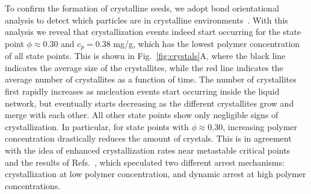 \documentclass[12pt]{article}
\begin{document}
To confirm the formation of crystalline seeds, we adopt bond orientational analysis to detect which particles are in crystalline environments~\cite{russo2013interplay}. 
With this analysis we reveal that crystallization events indeed start occurring for the state point $\phi\approx 0.30$ and $c_p=0.38$ mg/g, which has the lowest
polymer concentration of all state points. This is shown in Fig.~\ref{fig:crystals}A, where the black line indicates the average size of the crystallites, 
while the red line indicates the average number of crystallites as a function of time. The number of crystallites first rapidly increases as nucleation events
start occurring inside the liquid network, but eventually starts decreasing as the different crystallites grow and merge with each other.
All other state points show only negligible signs of crystallization. In particular, for state points with $\phi\approx 0.30$, increasing
polymer concentration drastically reduces the amount of crystals. This is in agreement with the
idea of enhanced crystallization rates near metastable critical points~\cite{ten1997enhancement,olmsted1998spinodal} and the
results of Refs.~\cite{fortini2008crystallization,perez2011pathways},
which speculated two different arrest mechanisms: crystallization at low polymer concentration, and dynamic arrest at high polymer concentrations.
\end{document}
